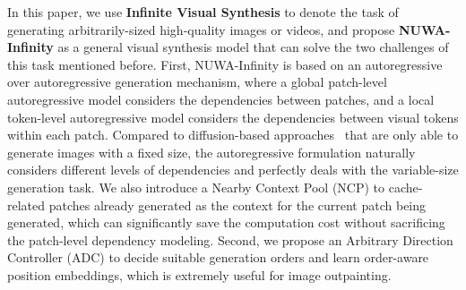 \documentclass{article}
\begin{document}
In this paper, we use \textbf{Infinite Visual Synthesis} to denote the task of generating arbitrarily-sized high-quality images or videos, and propose \textbf{NUWA-Infinity} as a general visual synthesis model that can solve the two challenges of this task mentioned before. First, NUWA-Infinity is based on an autoregressive over autoregressive generation mechanism, where a global patch-level autoregressive model considers the dependencies between patches, and a local token-level autoregressive model considers the dependencies between visual tokens within each patch. Compared to diffusion-based approaches~\cite{dhariwalDiffusionModelsBeat2021,hoDenoisingDiffusionProbabilistic2020,guVectorQuantizedDiffusion2022} that are only able to generate images with a fixed size, the autoregressive formulation naturally considers different levels of dependencies and perfectly deals with the variable-size generation task. We also introduce a Nearby Context Pool (NCP) to cache-related patches already generated as the context for the current patch being generated, which can significantly save the computation cost without sacrificing the patch-level dependency modeling. Second, we propose an Arbitrary Direction Controller (ADC) to decide suitable generation orders and learn order-aware position embeddings, which is extremely useful for image outpainting.
\end{document}
